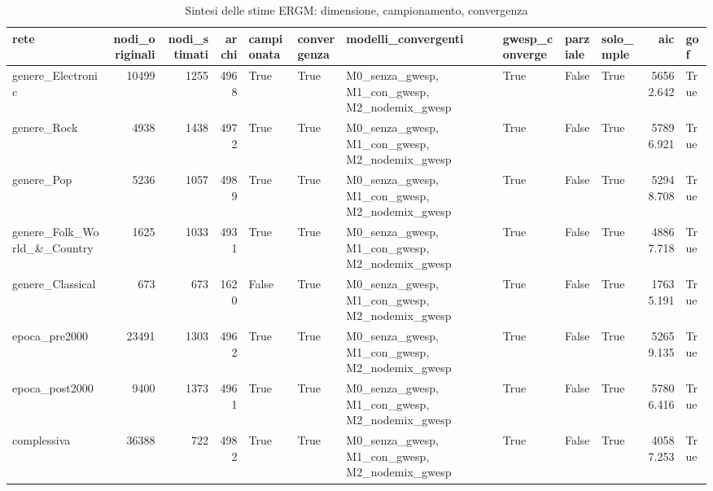 \begin{table}
\centering
\caption{Sintesi delle stime ERGM: dimensione, campionamento, convergenza}
\label{tab:t4_ergm_sintesi}
\begin{tabular}{lrrrllllllrl}
\toprule
                       rete &  nodi\_originali &  nodi\_stimati &  archi &  campionata &  convergenza &                            modelli\_convergenti &  gwesp\_converge &  parziale &  solo\_mple &       aic &  gof \\
\midrule
          genere\_Electronic &           10499 &          1255 &   4968 &        True &         True & M0\_senza\_gwesp, M1\_con\_gwesp, M2\_nodemix\_gwesp &            True &     False &       True & 56562.642 & True \\
                genere\_Rock &            4938 &          1438 &   4972 &        True &         True & M0\_senza\_gwesp, M1\_con\_gwesp, M2\_nodemix\_gwesp &            True &     False &       True & 57896.921 & True \\
                 genere\_Pop &            5236 &          1057 &   4989 &        True &         True & M0\_senza\_gwesp, M1\_con\_gwesp, M2\_nodemix\_gwesp &            True &     False &       True & 52948.708 & True \\
genere\_Folk\_World\_\&\_Country &            1625 &          1033 &   4931 &        True &         True & M0\_senza\_gwesp, M1\_con\_gwesp, M2\_nodemix\_gwesp &            True &     False &       True & 48867.718 & True \\
           genere\_Classical &             673 &           673 &   1620 &       False &         True & M0\_senza\_gwesp, M1\_con\_gwesp, M2\_nodemix\_gwesp &            True &     False &       True & 17635.191 & True \\
              epoca\_pre2000 &           23491 &          1303 &   4962 &        True &         True & M0\_senza\_gwesp, M1\_con\_gwesp, M2\_nodemix\_gwesp &            True &     False &       True & 52659.135 & True \\
             epoca\_post2000 &            9400 &          1373 &   4961 &        True &         True & M0\_senza\_gwesp, M1\_con\_gwesp, M2\_nodemix\_gwesp &            True &     False &       True & 57806.416 & True \\
                complessiva &           36388 &           722 &   4982 &        True &         True & M0\_senza\_gwesp, M1\_con\_gwesp, M2\_nodemix\_gwesp &            True &     False &       True & 40587.253 & True \\
\bottomrule
\end{tabular}
\end{table}
